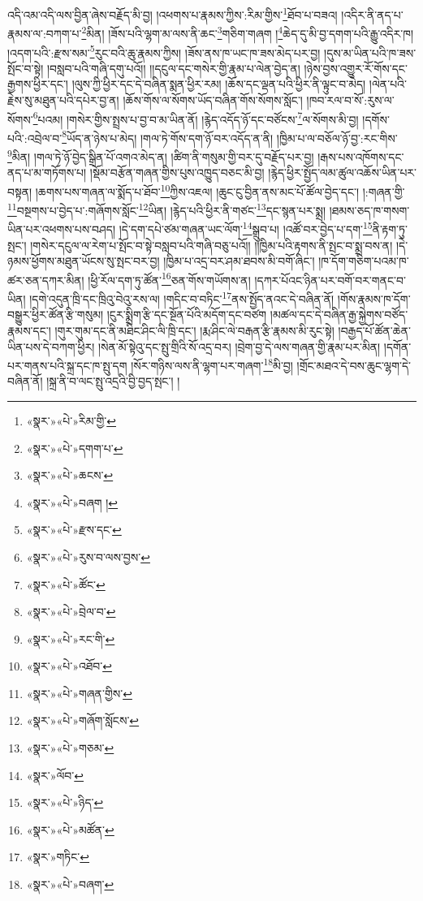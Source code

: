 འདི་འམ་འདི་ལས་བྱིན་ཞེས་བརྗོད་མི་བྱ། །འཕགས་པ་རྣམས་ཀྱིས་:རིམ་གྱིས་\footnote{«སྣར་»«པེ་»རིམ་གྱི་}ཐོབ་པ་བཟའ། །འདིར་ནི་ནད་པ་རྣམས་ལ་:བཀག་པ་\footnote{«སྣར་»«པེ་»དགག་པ་}མིན། །ཟོས་པའི་ལྷག་མ་ལས་ནི་ཆང་\footnote{«སྣར་»«པེ་»ཆངས་}གཅིག་གཞག །\footnote{«སྣར་»«པེ་»བཞག །}ཆེད་དུ་མི་བྱ་དགག་པའི་རྒྱུ་འདིར་ཁ། །འདག་པའི་:རྫས་སམ་\footnote{«སྣར་»«པེ་»རྫས་དང་}རུང་བའི་ཆུ་རྣམས་ཀྱིས། །ཟོས་ནས་ཁ་ཡང་ཁ་ཟས་མེད་པར་བྱ། །དུས་མ་ཡིན་པའི་ཁ་ཟས་སྤོང་བ་སྟེ། །བསླབ་པའི་གཞི་དགུ་པའོ།། །།དངུལ་དང་གསེར་གྱི་རྣམ་པ་ལེན་བྱེད་ན། །ཉེས་བྱས་འགྱུར་རོ་གོས་དང་རྒྱགས་ཕྱིར་དང་། །ལུས་ཀྱི་ཕྱིར་དང་དེ་བཞིན་སྨན་ཕྱིར་རམ། །ཆོས་དང་ལྡན་པའི་ཕྱིར་ནི་ལྟུང་བ་མེད། །ལེན་པའི་རྗེས་སུ་མཐུན་པའི་དཔེར་བྱ་ན། །ཆོས་གོས་ལ་སོགས་ཡོད་བཞིན་གོས་སོགས་སློང་། །ཁབ་རལ་བ་སོ་:རུས་ལ་སོགས་\footnote{«སྣར་»«པེ་»རུས་བ་ལས་བྱས་}པའམ། །གསེར་གྱིས་སྤྲས་པ་བྱ་བ་མ་ཡིན་ནོ། །རྙེད་འདོད་ཉོ་དང་བཙོངས་\footnote{«སྣར་»«པེ་»ཚོང་}ལ་སོགས་མི་བྱ། །དགོས་པའི་:འབྲེལ་བ་\footnote{«སྣར་»«པེ་»བྲེལ་བ་}ཡོད་ན་ཉེས་པ་མེད། །གལ་ཏེ་གོས་དག་ཉོ་བར་འདོད་ན་ནི། །ཁྱིམ་པ་ལ་བཅོལ་ཉོ་བྱ་:རང་གིས་\footnote{«སྣར་»«པེ་»རང་གི་}མིན། །གལ་ཏེ་ཉོ་བྱེད་སྒྲིན་པོ་འགའ་མེད་ན། །ཚིག་ནི་གསུམ་གྱི་བར་དུ་བརྗོད་པར་བྱ། །རྒས་པས་འཁོགས་དང་ནད་པ་མ་གཏོགས་པ། །སྡོམ་བརྩོན་གཞན་གྱིས་པུས་འཁྱུད་བཅང་མི་བྱ། །རྙེད་ཕྱིར་སྤྱོད་ལམ་ཚུལ་འཆོས་ཡིན་པར་བསྟན། །ཆགས་པས་གཞན་ལ་སྨོད་པ་ཐོབ་\footnote{«སྣར་»«པེ་»འཐོབ་}ཀྱིས་འཇལ། །ཆུང་ངུ་བྱིན་ནས་མང་པོ་ཚོལ་བྱེད་དང་། །:གཞན་གྱི་\footnote{«སྣར་»«པེ་»གཞན་གྱིས་}བསྔགས་པ་བྱེད་པ་:གཞོགས་སློང་\footnote{«སྣར་»«པེ་»གཞོག་སློངས་}ཡིན། །རྙེད་པའི་ཕྱིར་ནི་གཙང་\footnote{«སྣར་»«པེ་»གཅམ་}དང་སྙན་པར་སྨྲ། །ཐམས་ཅད་ཁ་གསག་ཡིན་པར་འཕགས་པས་བཤད། །དེ་དག་དཔེ་ཙམ་གཞན་ཡང་ལོག་\footnote{«སྣར་»ལོབ་}སྒྲུབ་པ། །འཚོ་བར་བྱེད་པ་དག་\footnote{«སྣར་»«པེ་»ཉིད་}ནི་རྟག་ཏུ་སྤང་། །གསེར་དངུལ་ལ་རེག་པ་སྤོང་བ་སྟེ་བསླབ་པའི་གཞི་བཅུ་པའོ།། །།ཁྱིམ་པའི་རྟགས་ནི་སྤང་བ་སྨྲ་བས་ན། །དེ་ཉམས་ཕྱོགས་མཐུན་ཡོངས་སུ་སྤང་བར་བྱ། །ཁྱིམ་པ་འདྲ་བར་ཤམ་ཐབས་མི་བགོ་ཞིང་། །ཁ་དོག་གཅིག་པའམ་ཁ་ཚར་ཅན་དཀར་མིན། །ཕྱི་རོལ་དག་ཏུ་ཚོན་\footnote{«སྣར་»«པེ་»མཚོན་}ཅན་གོས་གཡོགས་ན། །དཀར་པོའང་ཉིན་པར་བགོ་བར་གནང་བ་ཡིན། །དགེ་འདུན་ཁྲི་དང་ཁྲིའུ་བེའུ་རས་ལ། །གདིང་བ་བཏིང་\footnote{«སྣར་»གཏིང་}ནས་སྤྱོད་ནའང་དེ་བཞིན་ནོ། །གོས་རྣམས་ཁ་དོག་བསྒྱུར་ཕྱིར་ཚོན་རྩི་གསུམ། །ངུར་སྨྲིག་རྩི་དང་སྔོན་པོའི་མདོག་དང་བཙག །མཚལ་དང་དེ་བཞིན་རྒྱ་སྐྱེགས་བཙོད་རྣམས་དང་། །གུར་གུམ་དང་ནི་མཐིང་ཤིང་ལི་ཁྲི་དང་། །རྨ་ཤིང་ལེ་བརྒན་རྩི་རྣམས་མི་རུང་སྟེ། །བརྒྱད་པོ་ཚོན་ཆེན་ཡིན་པས་དེ་བཀག་ཕྱིར། །སེན་མོ་སྟེའུ་དང་སྤུ་གྲིའི་སོ་འདྲ་བར། །བྲེག་བྱ་དེ་ལས་གཞན་གྱི་རྣམ་པར་མིན། །དགོན་པར་གནས་པའི་སྐྲ་དང་ཁ་སྤུ་དག །སོར་གཉིས་ལས་ནི་ལྷག་པར་གཞག་\footnote{«སྣར་»«པེ་»བཞག་}མི་བྱ། །གྲོང་མཐའ་དེ་བས་ཆུང་ལྷག་དེ་བཞིན་ནོ། །སྐྲ་ནི་བ་ལང་སྤུ་འདྲའི་བྱི་བྱད་སྤང་། །
